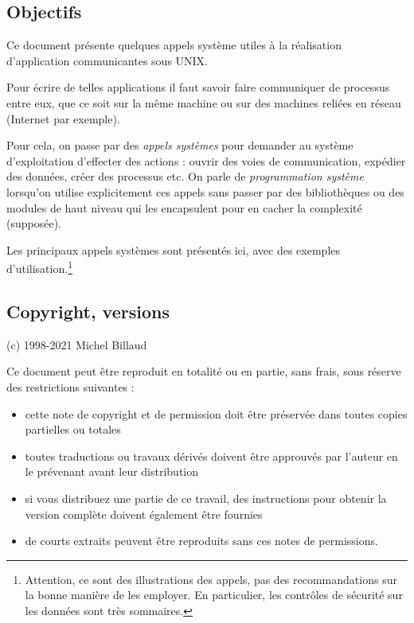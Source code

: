 

\subsection*{Objectifs}

Ce document présente quelques appels système utiles à la réalisation
d'application communicantes sous UNIX.

Pour écrire de telles applications il faut savoir faire communiquer de
processus entre eux, que ce soit sur la même machine ou sur des
machines reliées en réseau (Internet par exemple).


Pour cela, on passe par des \emph{appels systèmes} pour demander au
système d'exploitation d'effecter des actions : ouvrir des voies de
communication, expédier des données, créer des processus etc.  On
parle de \emph{programmation système} lorsqu'on utilise explicitement
ces appels sans passer par des bibliothèques ou des modules de haut
niveau qui les encapsulent pour en cacher la complexité (supposée).


Les principaux appels systèmes sont présentés ici, avec des exemples
d'utilisation.\footnote{Attention, ce sont des illustrations des
appels, pas des recommandations sur la bonne manière de les
employer. En particulier, les contrôles de sécurité sur les données
sont très sommaires.}



\subsection*{Copyright, versions}

(c) 1998-2021 Michel Billaud

Ce document peut être reproduit en totalité ou en partie, sans frais,
sous réserve des restrictions suivantes :
\begin{itemize}
\item  cette note de copyright et de permission doit être préservée
dans toutes copies partielles ou totales 
\item  toutes traductions ou
travaux dérivés doivent être approuvés par l'auteur en le prévenant
avant leur distribution 
\item  si vous distribuez une partie de ce
travail, des instructions pour obtenir la version complète doivent
également être fournies
\item de courts extraits peuvent être reproduits sans ces notes de
  permissions.
\end{itemize}

